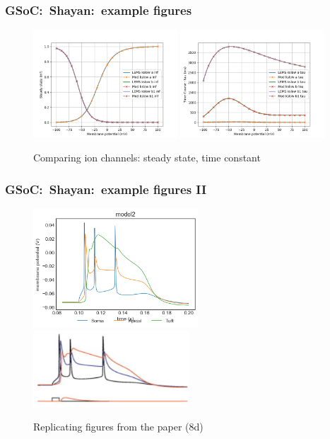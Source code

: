 \begin{frame}[c]
  \frametitle{GSoC:\ Shayan:\ example figures}
  \begin{figure}[h]
    \centering
    \includegraphics[width=0.48\textwidth]{99_images/kslow.inf}
    \includegraphics[width=0.48\textwidth]{99_images/kslow.tau}
    \caption{Comparing ion channels: steady state, time constant}%
    \label{fig:99_images-shayan-comparison}
  \end{figure}
\end{frame}
\begin{frame}[c]
  \frametitle{GSoC:\ Shayan:\ example figures II}
  \begin{figure}[h]
    \centering
    \includegraphics[width=0.55\textwidth]{99_images/output_d}\\
    \includegraphics[width=0.52\textwidth]{99_images/shayan-bahl-d}
    \caption{Replicating figures from the paper (8d)}%
    \label{fig:99_images-shayan-comparison-2}
  \end{figure}
\end{frame}
